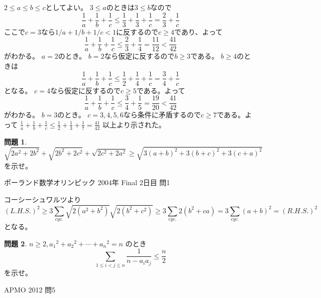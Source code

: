 \documentclass[uplatex, a5paper]{jsarticle}
\makeatletter
\theoremstyle{definition}
\newtheorem{prob}{問題}
\renewenvironment{proof}[1][\proofname]{
  \pushQED{\qed}%
  \normalfont \topsep6\p@\@plus6\p@\relax
  \trivlist
  \item[\hskip\labelsep
    #1\@addpunct{\textbf{.}}]\ignorespaces
}{%
  \popQED\endtrivlist\@endpefalse
}
\providecommand{\proofname}{証明}
\newcommand{\lhs }{ L.H.S. }
\newcommand{\rhs }{ R.H.S. }
\def\qed{\hfill $\Box$}
\makeatother
\begin{document}
\begin{proof}
  \(2\leq a \leq b \leq c\)としてよい。
  \(3\leq a\)のときは\(3\leq b\)なので
  \[
  \frac{1}{a} + \frac{1}{b} + \frac{1}{c} \leq \frac{1}{3}+\frac{1}{3} + \frac{1}{c} = \frac{2}{3} + \frac{1}{c}
  \]
  ここで\(c=3\)なら\(1/a+1/b+1/c<1\)に反するので\(c\geq 4\)であり、よって
  \[
  \frac{1}{a} + \frac{1}{b} + \frac{1}{c} \leq \frac{2}{3} + \frac{1}{4} = \frac{11}{12} < \frac{41}{42}
  \]
  がわかる。
  \(a=2\)のとき。
  \(b=2\)なら仮定に反するので\(b \geq 3\)である。
  \(b\geq 4\)のときは
  \[
  \frac{1}{a} + \frac{1}{b} + \frac{1}{c}
  \leq \frac{1}{2} + \frac{1}{4} + \frac{1}{c}
  = \frac{3}{4} + \frac{1}{c}
  \]
  となる。
  \(c=4\)なら仮定に反するので\(c \geq 5\)である。よって
  \[
  \frac{1}{a} + \frac{1}{b} + \frac{1}{c} \leq \frac{3}{4} + \frac{1}{5} = \frac{19}{20} < \frac{41}{42}
  \]
  がわかる。
  \(b=3\)のとき。
  \(c=3,4,5,6\)なら条件に矛盾するので\(c\geq 7\)である。よって
  \(
  \frac{1}{a} + \frac{1}{b} + \frac{1}{c} \leq \frac{1}{2} + \frac{1}{3} + \frac{1}{7} = \frac{41}{42}
  \)
  以上より示された。
\end{proof}















\newpage


\begin{prob}
  \[
  \sqrt{2a^2+2b^2} + \sqrt{2b^2+2c^2} + \sqrt{2c^2+2a^2} \geq \sqrt{3(a+b)^2 + 3(b+c)^2 + 3(c+a)^2}
  \]
  を示せ。
  \begin{flushright}
    ポーランド数学オリンピック 2004年 Final 2日目 問1
  \end{flushright}
\end{prob}


\begin{proof}
  コーシーシュワルツより
  \[
  (\lhs )^2 \geq 3\sum_{cyc.} \sqrt{2(a^2+b^2)}\sqrt{2(b^2+c^2)}
  \geq 3\sum_{cyc.} 2(b^2+ca) = 3\sum_{cyc.}(a+b)^2 = ( \rhs )^2
  \]
  となる。
\end{proof}











\newpage

\begin{prob}
  \(n \geq 2 , {a_1}^2 + {a_2}^2 + \cdots + {a_n}^2 = n\)
  のとき
  \[
  \sum_{1\leq i < j \leq n}\frac{1}{n-a_ia_j} \leq \frac{n}{2}
  \]
  を示せ。
  \begin{flushright}
    APMO 2012 問5
  \end{flushright}
\end{prob}
\end{document}
